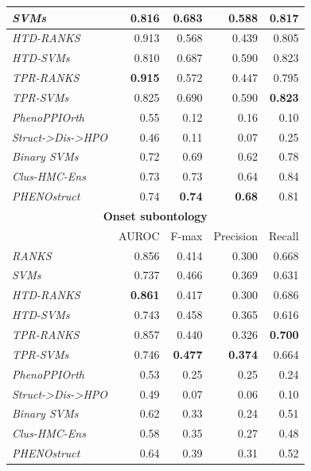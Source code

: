 \documentclass{bioinfo}
\begin{document}
\begin{table}[!h]
\begin{center}
\begin{tabular}{|l|r|r|r|r|}
\textsl{SVMs} 		& 0.816 & 0.683 & 0.588 & 0.817 \\ \hline
\textsl{HTD-RANKS} 	& 0.913 & 0.568 & 0.439 & 0.805 \\  \hline
\textsl{HTD-SVMs}   & 0.810 & 0.687 & 0.590 & 0.823 \\  \hline
\textsl{TPR-RANKS}  & {\bf 0.915} & 0.572 & 0.447 & 0.795 \\  \hline
\textsl{TPR-SVMs}   & 0.825 & 0.690 & 0.590 &	 {\bf 0.823} \\  \hline
\textsl{PhenoPPIOrth} & 0.55 & 0.12 & 0.16 & 0.10 \\ \hline
\textsl{Struct->Dis->HPO} & 0.46 & 0.11 & 0.07 & 0.25  \\ \hline
\textsl{Binary SVMs}  & 0.72 & 0.69 & 0.62 & 0.78  \\\hline 
\textsl{Clus-HMC-Ens}   & 0.73 & 0.73  &   0.64 & 0.84 		 \\ 	 \hline
\textsl{PHENOstruct}    & 0.74 & {\bf 0.74}  &  {\bf 0.68} & 0.81    \\ 	 \hline
\hline   
  \multicolumn{5}{|c|}{{\bf Onset subontology}  }\\ \hline
     &  AUROC & F-max  &  Precision  & Recall  \\ \hline
\textsl{RANKS} 			& 0.856 & 0.414 & 0.300 & 0.668 \\ \hline
\textsl{SVMs} 			& 0.737 & 0.466 & 0.369 & 0.631 \\ \hline
\textsl{HTD-RANKS}       & {\bf 0.861} & 0.417 & 0.300 & 0.686 \\  \hline
\textsl{HTD-SVMs}        & 0.743 & 0.458 & 0.365  & 0.616 \\  \hline
\textsl{TPR-RANKS}       & 0.857 & 0.440 & 0.326 & {\bf 0.700}	\\  \hline
\textsl{TPR-SVMs}        & 0.746 & {\bf 0.477} & {\bf 0.374} & 0.664	\\  \hline
\textsl{PhenoPPIOrth} & 0.53 & 0.25 & 0.25 & 0.24  \\ \hline
\textsl{Struct->Dis->HPO} & 0.49  & 0.07 & 0.06 & 0.10 \\ \hline
\textsl{Binary SVMs}  & 0.62 & 0.33 & 0.24 & 0.51 \\ \hline
\textsl{Clus-HMC-Ens}    & 0.58 	 &   0.35 & 0.27 & 0.48 					 \\   \hline
\textsl{PHENOstruct}     & 0.64 	 &   0.39 & 0.31 & 0.52 					  \\   \hline
\end{tabular} 
\end{center}
\end{table}
\end{document}
